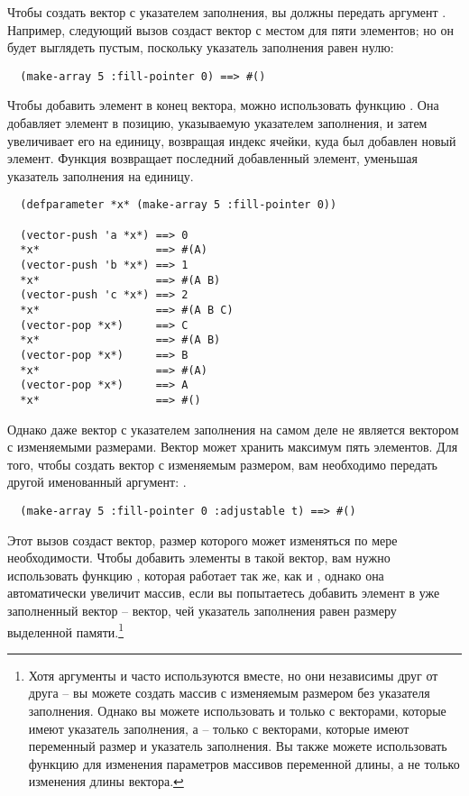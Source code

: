 Чтобы создать вектор с указателем заполнения, вы должны передать 
аргумент .  Например, следующий вызов  создаст вектор
с местом для пяти элементов; но он будет выглядеть пустым, поскольку указатель заполнения
равен нулю:

\begin{verbatim}
  (make-array 5 :fill-pointer 0) ==> #()
\end{verbatim}

Чтобы добавить элемент в конец вектора, можно использовать функцию
.  Она добавляет элемент в позицию, указываемую указателем заполнения, и
затем увеличивает его на единицу, возвращая индекс ячейки, куда был добавлен новый
элемент.  Функция  возвращает последний добавленный элемент, уменьшая
указатель заполнения на единицу.

\begin{verbatim}
  (defparameter *x* (make-array 5 :fill-pointer 0))
  
  (vector-push 'a *x*) ==> 0
  *x*                  ==> #(A)
  (vector-push 'b *x*) ==> 1
  *x*                  ==> #(A B)
  (vector-push 'c *x*) ==> 2
  *x*                  ==> #(A B C)
  (vector-pop *x*)     ==> C
  *x*                  ==> #(A B)
  (vector-pop *x*)     ==> B
  *x*                  ==> #(A)
  (vector-pop *x*)     ==> A
  *x*                  ==> #()
\end{verbatim}

Однако даже вектор с указателем заполнения на самом деле не является вектором с изменяемыми
размерами.  Вектор  может хранить максимум пять элементов.  Для того, чтобы
создать вектор с изменяемым размером, вам необходимо передать  другой
именованный аргумент: .

\begin{verbatim}
  (make-array 5 :fill-pointer 0 :adjustable t) ==> #()
\end{verbatim}

Этот вызов создаст вектор, размер которого может изменяться по мере необходимости.  Чтобы
добавить элементы в такой вектор, вам нужно использовать функцию
, которая работает так же, как и , однако
она автоматически увеличит массив, если вы попытаетесь добавить элемент в
уже заполненный вектор -- вектор, чей указатель заполнения равен размеру выделенной
памяти.\footnote{Хотя аргументы  и  часто используются
  вместе, но они независимы друг от друга -- вы можете создать
  массив с изменяемым размером без указателя заполнения.  Однако вы можете использовать
   и  только с векторами, которые имеют указатель
  заполнения, а  -- только с векторами, которые имеют переменный
  размер и указатель заполнения.  Вы также можете использовать функцию 
  для изменения параметров массивов переменной длины, а не только изменения длины
  вектора.}


